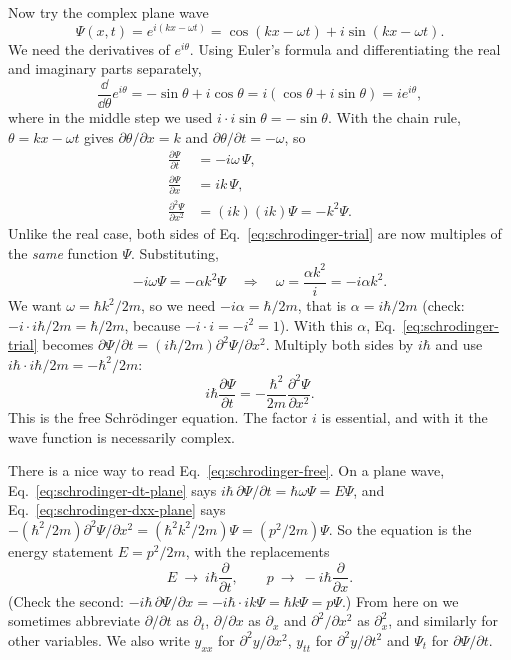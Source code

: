 Now try the complex plane wave
\begin{equation}
\Psi(x,t)=e^{i(kx-\omega t)}=\cos(kx-\omega t)+i\sin(kx-\omega t).
\label{eq:schrodinger-planewave}
\end{equation}
We need the derivatives of $e^{i\theta}$. Using Euler's formula and differentiating the real and imaginary parts separately,
\[
\frac{\dd}{\dd\theta}e^{i\theta}=-\sin\theta+i\cos\theta=i(\cos\theta+i\sin\theta)=ie^{i\theta},
\]
where in the middle step we used $i\cdot i\sin\theta=-\sin\theta$. With the chain rule, $\theta=kx-\omega t$ gives $\partial\theta/\partial x=k$ and $\partial\theta/\partial t=-\omega$, so
\begin{align}
\frac{\partial\Psi}{\partial t}&=-i\omega\,\Psi,\label{eq:schrodinger-dt-plane}\\
\frac{\partial\Psi}{\partial x}&=ik\,\Psi,\\
\frac{\partial^2\Psi}{\partial x^2}&=(ik)(ik)\Psi=-k^2\Psi.\label{eq:schrodinger-dxx-plane}
\end{align}
Unlike the real case, both sides of Eq.~\eqref{eq:schrodinger-trial} are now multiples of the \emph{same} function $\Psi$. Substituting,
\[
-i\omega\Psi=-\alpha k^2\Psi
\quad\Longrightarrow\quad
\omega=\frac{\alpha k^2}{i}=-i\alpha k^2.
\]
We want $\omega=\hbar k^2/2m$, so we need $-i\alpha=\hbar/2m$, that is $\alpha=i\hbar/2m$ (check: $-i\cdot i\hbar/2m=\hbar/2m$, because $-i\cdot i=-i^2=1$). With this $\alpha$, Eq.~\eqref{eq:schrodinger-trial} becomes $\partial\Psi/\partial t=(i\hbar/2m)\partial^2\Psi/\partial x^2$. Multiply both sides by $i\hbar$ and use $i\hbar\cdot i\hbar/2m=-\hbar^2/2m$:
\begin{equation}
i\hbar\frac{\partial\Psi}{\partial t}=-\frac{\hbar^2}{2m}\frac{\partial^2\Psi}{\partial x^2}.
\label{eq:schrodinger-free}
\end{equation}
This is the free Schr\"odinger equation. The factor $i$ is essential, and with it the wave function is necessarily complex.

There is a nice way to read Eq.~\eqref{eq:schrodinger-free}. On a plane wave, Eq.~\eqref{eq:schrodinger-dt-plane} says $i\hbar\,\partial\Psi/\partial t=\hbar\omega\Psi=E\Psi$, and Eq.~\eqref{eq:schrodinger-dxx-plane} says $-(\hbar^2/2m)\partial^2\Psi/\partial x^2=(\hbar^2k^2/2m)\Psi=(p^2/2m)\Psi$. So the equation is the energy statement $E=p^2/2m$, with the replacements
\begin{equation}
E\ \longrightarrow\ i\hbar\frac{\partial}{\partial t},\qquad p\ \longrightarrow\ -i\hbar\frac{\partial}{\partial x}.
\label{eq:schrodinger-replacements}
\end{equation}
(Check the second: $-i\hbar\,\partial\Psi/\partial x=-i\hbar\cdot ik\Psi=\hbar k\Psi=p\Psi$.) From here on we sometimes abbreviate $\partial/\partial t$ as $\partial_t$, $\partial/\partial x$ as $\partial_x$ and $\partial^2/\partial x^2$ as $\partial_x^2$, and similarly for other variables. We also write $y_{xx}$ for $\partial^2y/\partial x^2$, $y_{tt}$ for $\partial^2y/\partial t^2$ and $\Psi_t$ for $\partial\Psi/\partial t$.


